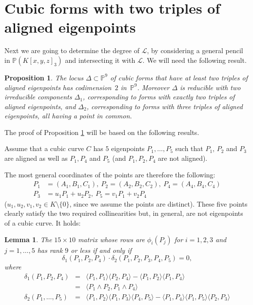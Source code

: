 \documentclass{amsart}
\theoremstyle{plain}
\newtheorem{prop}[theorem]{Proposition}
\newtheorem{lemma}[theorem]{Lemma}
\theoremstyle{definition}
\newcommand{\p}{\mathbb{P}}
\newcommand{\sL}{\mathcal{L}}
\newcommand{\scl}[2]{\langle #1, #2 \rangle}
\begin{document}
\section{Cubic forms with two triples of aligned eigenpoints} 
Next we are going to determine the degree of $\sL$, by considering a general pencil in $\p(K[x,y,z]_3)$
and intersecting it with $\sL$. We will need the following result.

\begin{prop}\label{pro: dimension of Delta}
    The locus $\Delta \subset \p^9$ of cubic forms that have at least two triples of aligned eigenpoints has codimension~$2$ in~$\p^9$. Moreover $\Delta$ is reducible with two irreducible components
    $\Delta_1$, corresponding to forms with exactly two triples of aligned eigenpoints, and $\Delta_2$, corresponding to forms with three triples of aligned eigenpoints, all having a point in common.
\end{prop}

The proof of Proposition \ref{pro: dimension of Delta} will be based on the following results.

Assume that a cubic curve $C$
has $5$ eigenpoints $P_1, \dots, P_5$ such that
$P_1$, $P_2$ and $P_3$ are aligned as well as
$P_1, P_4$ and $P_5$ (and $P_1, P_2, P_4$ are not aligned). 

The most general coordinates of the points are therefore the following:
\begin{equation}
  \label{5points}
  \begin{split}
P_1 &= (A_1, B_1, C_1), \ P_2 = (A_2, B_2, C_2), \  P_4 = (A_4, B_4, C_4)\\
P_3 &= u_1P_1+u_2P_2, \ P_5 = v_1P_1 +v_2P_4
\end{split}
\end{equation}
($u_1, u_2, v_1, v_2 \in K\setminus\{0\}$, since we assume the points
are distinct).
These five points clearly satisfy the two required collinearities 
but, in general, are not eigenpoints of a cubic curve.
It holds:
\begin{lemma}
  The $15 \times 10$ matrix whose rows are
  $\phi_i(P_j)$ for $i=1, 2, 3$ and $j = 1, \dots, 5$ has rank $9$ or less
  if and only if
  \[
  \delta_1(P_1, P_2, P_4)\cdot \delta_2(P_1, P_2, P_3, P_4, P_5) = 0,
  \]
  where
  \begin{eqnarray}
    \delta_1(P_1, P_2, P_4)  & = & \scl{P_1}{P_1}\scl{P_2}{P_4} -
    \scl{P_1}{P_2}\scl{P_1}{P_4} \label{delta1}\\
    & = &  \scl{P_1 \wedge P_2}{P_1 \wedge P_4} \nonumber \\
    \delta_2(P_1, \dots, P_5) & = &
         \scl{P_1}{P_2}\scl{P_1}{P_3}\scl{P_4}{P_5}-
    \scl{P_1}{P_4}\scl{P_1}{P_5}\scl{P_2}{P_3} \label{delta2}
  \end{eqnarray}
  \label{propFrc}
\end{lemma}
\end{document}
